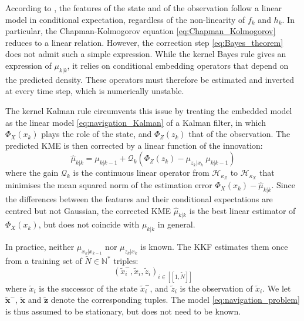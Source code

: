 According to , the features of the state and of the observation follow a linear model in conditional expectation, regardless of the non-linearity of $f_k$ and $h_k$. In particular, the Chapman-Kolmogorov equation \eqref{eq:Chapman_Kolmogorov} reduces to a linear relation. However, the correction step \eqref{eq:Bayes_theorem} does not admit such a simple expression. While the kernel Bayes rule \cite{bib:kernel-embeddings} gives an expression of $\mu_{k|k}$, it relies on conditional embedding operators that depend on the predicted density. These operators must therefore be estimated and inverted at every time step, which is numerically unstable.

The kernel Kalman rule circumvents this issue by treating the embedded model as the linear model \eqref{eq:navigation_Kalman} of a Kalman filter, in which $\Phi_X(x_k)$ plays the role of the state, and $\Phi_Z(z_k)$ that of the observation. The predicted KME is then corrected by a linear function of the innovation:
\begin{equation}
	\hat{\mu}_{k|k}=\mu_{k|k-1}+\mathcal{Q}_k\left(\Phi_Z(z_k)-\mu_{z_k|x_k}\:\mu_{k|k-1}\right)
\end{equation}
where the gain $\mathcal{Q}_k$ is the continuous linear operator from $\mathcal{H}_{\kappa_Z}$ to $\mathcal{H}_{\kappa_X}$ that minimises the mean squared norm of the estimation error $\Phi_X(x_k)-\hat{\mu}_{k|k}$. Since the differences between the features and their conditional expectations are centred but not Gaussian, the corrected KME $\hat{\mu}_{k|k}$ is the best linear estimator of $\Phi_X(x_k)$, but does not coincide with $\mu_{k|k}$ in general.

In practice, neither $\mu_{x_k|x_{k-1}}$ nor $\mu_{z_k|x_k}$ is known. The KKF estimates them once from a training set of $\tilde{N}\in\mathbb{N}^*$ triples:
\begin{equation}
	\left(\tilde{x}_i^-,\tilde{x}_i,\tilde{z}_i\right)_{i\in[\![1,\tilde{N}]\!]}
\end{equation}
where $\tilde{x}_i$ is the successor of the state $\tilde{x}_i^-$, and $\tilde{z}_i$ is the observation of $\tilde{x}_i$. We let $\tilde{\mathbf{x}}^-$, $\tilde{\mathbf{x}}$ and $\tilde{\mathbf{z}}$ denote the corresponding tuples. The model \eqref{eq:navigation_problem} is thus assumed to be stationary, but does not need to be known.

